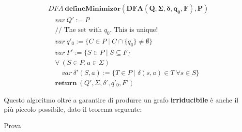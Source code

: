 \begin{align*}
& DFA \ \mathbf{defineMinimizor(DFA(Q,\Sigma,\delta,q_0,F), P)}             \\
& \quad var \ Q' := P                                                       \\
& \quad \text{// The set with } q_0 \text{. This is unique!}                \\
& \quad var \ q'_0 := \{C \in P \mid C \cap \{q_0\} \neq \emptyset\}        \\
& \quad var \ F' := \{S \in P \mid S \subseteq F\}                          \\
& \quad \forall \ (S \in P, a \in \Sigma)                                   \\
& \qquad var \ \delta'(S,a):=\{T\in P\mid\delta(s,a)\in T\ \forall s\in S\} \\
& \quad \mathbf{return} \ (Q',\Sigma,\delta',q'_0,F')
\end{align*}

Questo algoritmo oltre a garantire di produrre un grafo \textbf{irriducibile} è
anche il più piccolo possibile, dato il teorema seguente:

\begin{theorem}
  Prova
\end{theorem}
